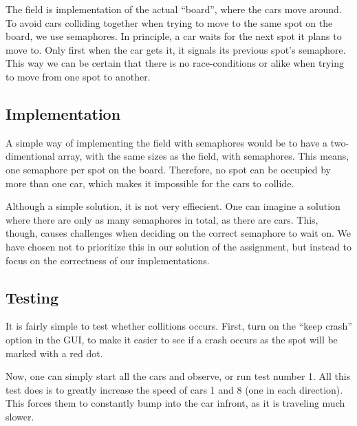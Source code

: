 
The field is implementation of the actual ``board'', where the cars move
around. To avoid cars colliding together when trying to move to the
same spot on the board, we use semaphores. In principle, a car waits
for the next spot it plans to move to. Only first when the car gets
it, it signals its previous spot's semaphore. This way we can be
certain that there is no race-conditions or alike when trying to move
from one spot to another.


\subsection{Implementation}
\label{sub:field-impl}
A simple way of implementing the field with semaphores would be to
have a two-dimentional array, with the same sizes as the field, with
semaphores. This means, one semaphore per spot on the
board. Therefore, no spot can be occupied by more than one car, which
makes it impossible for the cars to collide.

Although a simple solution, it is not very effiecient. One can imagine
a solution where there are only as many semaphores in total, as there
are cars. This, though, causes challenges when deciding on the
correct semaphore to wait on. We have chosen not to
prioritize this in our solution of the assignment, but instead to focus on the correctness of our implementations.


\subsection{Testing}
\label{sub:field-test}
It is fairly simple to test whether collitions occurs. First, turn on
the ``keep crash'' option in the GUI, to make it easier to see if a
crash occurs as the spot will be marked with a red dot.

Now, one can simply start all the cars and observe, or run test number
1. All this test does is to greatly increase the speed of cars 1 and 8
(one in each direction). This forces them to constantly bump into the
car infront, as it is traveling much slower.
